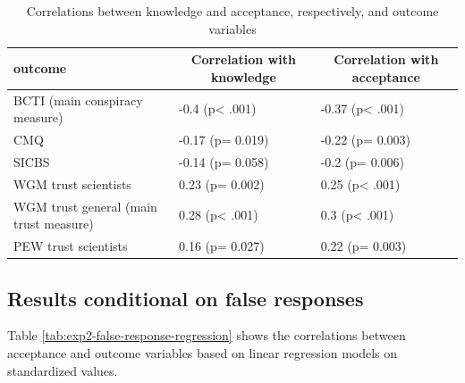 \documentclass[
  doc,floatsintext]{apa6}
\begin{document}
\begin{table}[tbp]

\begin{center}
\begin{threeparttable}

\caption{\label{tab:exp2-correlations-outcomes}Correlations between knowledge and acceptance, respectively, and outcome variables}

\begin{tabular}{lll}
\toprule
outcome & \multicolumn{1}{c}{Correlation with knowledge} & \multicolumn{1}{c}{Correlation with acceptance}\\
\midrule
BCTI 
(main conspiracy measure) & -0.4 (p< .001) & -0.37 (p< .001)\\
CMQ & -0.17 (p= 0.019) & -0.22 (p= 0.003)\\
SICBS & -0.14 (p= 0.058) & -0.2 (p= 0.006)\\
WGM trust scientists & 0.23 (p= 0.002) & 0.25 (p< .001)\\
WGM trust general 
(main trust measure) & 0.28 (p< .001) & 0.3 (p< .001)\\
PEW trust scientists & 0.16 (p= 0.027) & 0.22 (p= 0.003)\\
\bottomrule
\end{tabular}

\end{threeparttable}
\end{center}

\end{table}

\subsection{Results conditional on false responses}\label{results-conditional-on-false-responses-1}

Table \ref{tab:exp2-false-response-regression} shows the correlations between acceptance and outcome variables based on linear regression models on standardized values.
\end{document}

